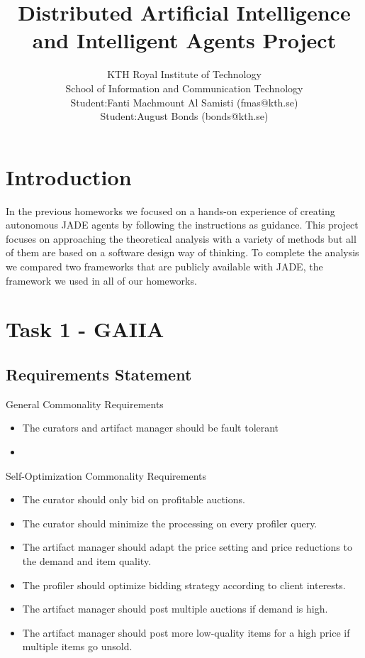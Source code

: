 \documentclass[a4paper, 11pt]{article}
\title{\textbf{Distributed Artificial Intelligence and Intelligent Agents Project}}
\author{KTH Royal Institute of Technology \\ 
		School of Information and Communication Technology \\
		Student:Fanti Machmount Al Samisti (fmas@kth.se) \\
		Student:August Bonds (bonds@kth.se)}
\begin{document}
	
\maketitle

\tableofcontents

\section{Introduction}

In the previous homeworks we focused on a hands-on experience of creating autonomous JADE agents by following the instructions as guidance. This project focuses on approaching the theoretical analysis with a variety of methods but all of them are based on a software design way of thinking. To complete the analysis we compared two frameworks that are publicly available with JADE, the framework we used in all of our homeworks.

\section{Task 1 - GAIIA}

\subsection{Requirements Statement}

General Commonality Requirements
\begin{itemize}
\item The curators and artifact manager should be fault tolerant
\item 
\end{itemize}

Self-Optimization Commonality Requirements
\begin{itemize}
\item The curator should only bid on profitable auctions.
\item The curator should minimize the processing on every profiler query.
\item The artifact manager should adapt the price setting and price reductions to the demand and item quality.
\item The profiler should optimize bidding strategy according to client interests.
\item The artifact manager should post multiple auctions if demand is high. 
\item The artifact manager should post more low-quality items for a high price if multiple items go unsold. 
\end{itemize}
\end{document}
